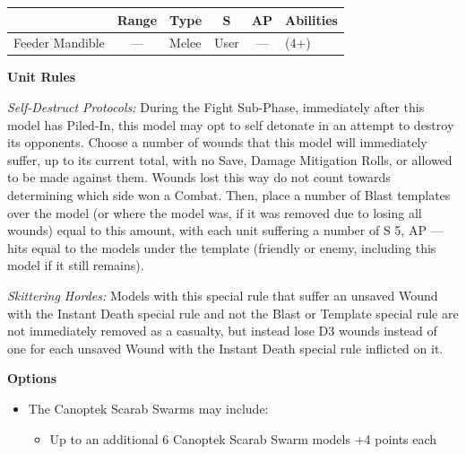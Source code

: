 \begin{minipage}[t]{0.72\textwidth}
	\begin{tabular}{L{90 pt} c C{40pt} *{2}{c} >{\raggedright\arraybackslash}p{130pt}}
		& Range & Type & S & AP & Abilities \\
		\hline
		Feeder Mandible & — & Melee & User & — &  (4+) \\
	\end{tabular}

	\vspace*{2em}
	\textbf{Unit Rules}
	
	\textit{Self-Destruct Protocols:} During the Fight Sub-Phase, immediately after this model has Piled-In, this model may opt to self detonate in an attempt to destroy its opponents. Choose a number of wounds that this model will immediately suffer, up to its current total, with no Save, Damage Mitigation Rolls, or  allowed to be made against them. Wounds lost this way do not count towards determining which side won a Combat. Then, place a number of Blast templates over the model (or where the model was, if it was removed due to losing all wounds) equal to this amount, with each unit suffering a number of S 5, AP — hits equal to the models under the template (friendly or enemy, including this model if it still remains).
	
	\textit{Skittering Hordes:} Models with this special rule that suffer an unsaved Wound with the Instant Death special rule and not the Blast or Template special rule are not immediately removed as a casualty, but instead lose D3 wounds instead of one for each unsaved Wound with the Instant Death special rule inflicted on it.

	\vspace*{2em}
	\textbf{Options}
	\begin{itemize}
		\item The Canoptek Scarab Swarms may include:
		\begin{itemize}
			\item Up to an additional 6 Canoptek Scarab Swarm models \dotfill +4 points each
		\end{itemize}
	\end{itemize}
\end{minipage}
\hspace{0.5em}


